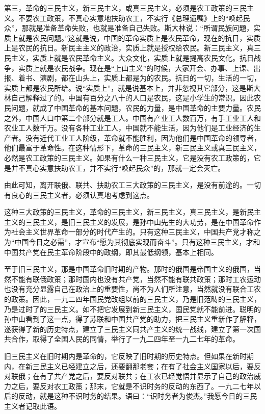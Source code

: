 第三，革命的三民主义，新三民主义，或真三民主义，必须是农工政策的三民主义。不要农工政策，不真心实意地扶助农工，不实行《总理遗嘱》上的“唤起民众”，那就是准备革命失败，也就是准备自己失败。斯大林说：“所谓民族问题，实质上就是农民问题。”这就是说，中国的革命实质上是农民革命，现在的抗日，实质上是农民的抗日。新民主主义的政治，实质上就是授权给农民。新三民主义，真三民主义，实质上就是农民革命主义。大众文化，实质上就是提高农民文化。抗日战争，实质上就是农民战争。现在是“上山主义”的时候，大家开会、办事、上课、出报、着书、演剧，都在山头上，实质上都是为的农民。抗日的一切，生活的一切，实质上都是农民所给。说“实质上”，就是说基本上，并非忽视其它部分，这是斯大林自己解释过了的。中国有百分之八十的人口是农民，这是小学生的常识。因此农民问题，就成了中国革命的基本问题，农民的力量，是中国革命的主要力量。农民之外，中国人口中第二个部分就是工人。中国有产业工人数百万，有手工业工人和农业工人数千万。没有各种工业工人，中国就不能生活，因为他们是工业经济的生产者。没有近代工业工人阶级，革命就不能胜利，因为他们是中国革命的领导者，他们最富于革命性。在这种情形下，革命的三民主义，新三民主义或真三民主义，必然是农工政策的三民主义。如果有什么一种三民主义，它是没有农工政策的，它是并不真心实意扶助农工，并不实行“唤起民众”的，那就一定会灭亡。

由此可知，离开联俄、联共、扶助农工三大政策的三民主义，是没有前途的。一切有良心的三民主义者，必须认真地考虑到这点。

这种三大政策的三民主义，革命的三民主义，新三民主义，真三民主义，是新民主主义的三民主义，是旧三民主义的发展，是孙中山先生的大功劳，是在中国革命作为社会主义世界革命一部分的时代产生的。只有这种三民主义，中国共产党才称之为“中国今日之必需”，才宣布“愿为其彻底实现而奋斗”。只有这种三民主义，才和中国共产党在民主革命阶段中的政纲，即其最低纲领，基本上相同。

至于旧三民主义，那是中国革命旧时期的产物。那时的俄国是帝国主义的俄国，当然不能有联俄政策；那时国内也没有共产党，当然不能有联共政策；那时工农运动也没有充分显露自己在政治上的重要性，尚不为人们所注意，当然就没有联合工农的政策。因此，一九二四年国民党改组以前的三民主义，乃是旧范畴的三民主义，乃是过时了的三民主义。如不把它发展到新三民主义，国民党就不能前进。聪明的孙中山看到了这一点，得了苏联和中国共产党的助力，把三民主义重新作了解释，遂获得了新的历史特点，建立了三民主义同共产主义的统一战线，建立了第一次国共合作，取得了全国人民的同情，举行了一九二四年至一九二七年的革命。

旧三民主义在旧时期内是革命的，它反映了旧时期的历史特点。但如果在新时期内，在新三民主义已经建立之后，还要翻那老套；在有了社会主义国家以后，要反对联俄；在有了共产党之后，要反对联共；在工农已经觉悟并显示了自己的政治威力之后，要反对农工政策；那末，它就是不识时务的反动的东西了。一九二七年以后的反动，就是这种不识时务的结果。语曰：“识时务者为俊杰。”我愿今日的三民主义者记取此语。

